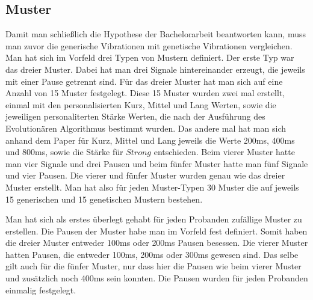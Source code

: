 \subsection{Muster}

Damit man schlie{\ss}lich die Hypothese der Bachelorarbeit beantworten kann, muss man zuvor die generische Vibrationen mit genetische Vibrationen vergleichen. 
Man hat sich im Vorfeld drei Typen von Mustern definiert. Der erste Typ war das dreier Muster. Dabei hat man drei Signale hintereinander erzeugt,  die jeweils mit einer Pause getrennt sind. F{\"u}r das dreier Muster hat man sich auf eine Anzahl von 15 Muster festgelegt. Diese 15 Muster wurden zwei mal erstellt, einmal mit den personalisierten Kurz, Mittel und Lang Werten, sowie die jeweiligen personaliterten St{\"a}rke Werten, die nach der Ausf{\"u}hrung des Evolution{\"a}ren Algorithmus bestimmt wurden. Das andere mal hat man sich anhand dem Paper \cite{pescara2016ruttelflug} f{\"u}r Kurz, Mittel und Lang jeweils die Werte 200ms, 400ms und 800ms, sowie die St{\"a}rke f{\"u}r $Strong$ entschieden.  
Beim vierer Muster hatte man vier Signale und drei Pausen und beim f{\"u}nfer Muster hatte man f{\"u}nf Signale und vier Pausen. 
Die vierer und f{\"u}nfer Muster wurden genau wie das dreier Muster erstellt. Man hat also f{\"u}r jeden Muster-Typen 30 Muster die auf jeweils 15 generischen und 15 genetischen Mustern bestehen.


Man hat sich als erstes {\"u}berlegt gehabt f{\"u}r jeden Probanden zuf{\"a}llige Muster zu erstellen. 
Die Pausen der Muster habe man im Vorfeld fest definiert.
Somit haben die dreier Muster entweder 100ms oder 200ms Pausen besessen.
Die vierer Muster hatten Pausen, die entweder 100ms, 200ms oder 300ms gewesen sind. Das selbe gilt auch f{\"u}r die f{\"u}nfer Muster, nur dass hier die Pausen wie beim vierer Muster und zus{\"a}tzlich noch 400ms sein konnten.
Die Pausen wurden f{\"u}r jeden Probanden einmalig festgelegt.

